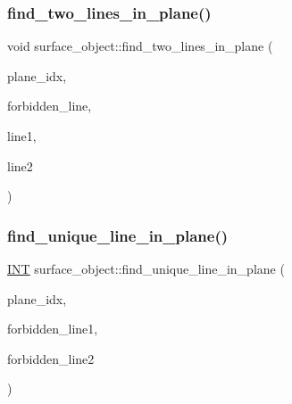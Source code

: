 \mbox{\label{classsurface__object_a7d84feab77fd5ee7bee51d6f0b20e997}} 
\subsubsection{\texorpdfstring{find\+\_\+two\+\_\+lines\+\_\+in\+\_\+plane()}{find\_two\_lines\_in\_plane()}}
{\footnotesize\ttfamily void surface\+\_\+object\+::find\+\_\+two\+\_\+lines\+\_\+in\+\_\+plane (\begin{DoxyParamCaption}\item[{\mbox{\hyperlink{galois_8h_a09fddde158a3a20bd2dcadb609de11dc}{I\+NT}}}]{plane\+\_\+idx,  }\item[{\mbox{\hyperlink{galois_8h_a09fddde158a3a20bd2dcadb609de11dc}{I\+NT}}}]{forbidden\+\_\+line,  }\item[{\mbox{\hyperlink{galois_8h_a09fddde158a3a20bd2dcadb609de11dc}{I\+NT}} \&}]{line1,  }\item[{\mbox{\hyperlink{galois_8h_a09fddde158a3a20bd2dcadb609de11dc}{I\+NT}} \&}]{line2 }\end{DoxyParamCaption})}

\mbox{\label{classsurface__object_a4cc84ee3f85ee271c663be786e8be807}} 
\subsubsection{\texorpdfstring{find\+\_\+unique\+\_\+line\+\_\+in\+\_\+plane()}{find\_unique\_line\_in\_plane()}}
{\footnotesize\ttfamily \mbox{\hyperlink{galois_8h_a09fddde158a3a20bd2dcadb609de11dc}{I\+NT}} surface\+\_\+object\+::find\+\_\+unique\+\_\+line\+\_\+in\+\_\+plane (\begin{DoxyParamCaption}\item[{\mbox{\hyperlink{galois_8h_a09fddde158a3a20bd2dcadb609de11dc}{I\+NT}}}]{plane\+\_\+idx,  }\item[{\mbox{\hyperlink{galois_8h_a09fddde158a3a20bd2dcadb609de11dc}{I\+NT}}}]{forbidden\+\_\+line1,  }\item[{\mbox{\hyperlink{galois_8h_a09fddde158a3a20bd2dcadb609de11dc}{I\+NT}}}]{forbidden\+\_\+line2 }\end{DoxyParamCaption})}

